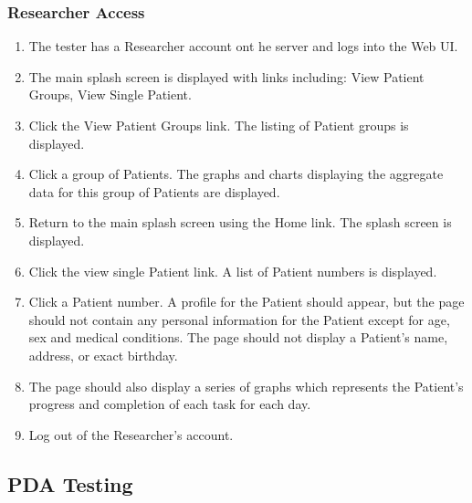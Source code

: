 \documentclass{article}
\begin{document}
\subsubsection{Researcher Access}
\begin{enumerate}
\item The tester has a Researcher account ont he server and logs into the Web UI.
\item The main splash screen is displayed with links including: View Patient Groups, View Single Patient.
\item Click the View Patient Groups link. The listing of Patient groups is displayed.
\item Click a group of Patients. The graphs and charts displaying the aggregate data for this group of Patients are displayed.
\item Return to the main splash screen using the Home link. The splash screen is displayed.
\item Click the view single Patient link. A list of Patient numbers is displayed.
\item Click a Patient number. A profile for the Patient should appear, but the page should not contain any personal information for the Patient except for age, sex and medical conditions. The page should not display a Patient's name, address, or exact birthday. 
\item The page should also display a series of graphs which represents the Patient's progress and completion of each task for each day.
\item Log out of the Researcher's account.
\end{enumerate}

\subsection{PDA Testing}
\end{document}
